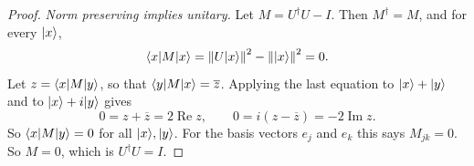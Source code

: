 \begin{exercisebox}
\begin{proof}
    \emph{Norm preserving implies unitary.} Let $M = U^\dagger U - I$. Then $M^\dagger = M$, and for
    every $\lvert x \rangle$,
    \[\langle x \rvert M \lvert x \rangle = \left\lVert U \lvert x \rangle \right\rVert^2 - \left\lVert \lvert x \rangle \right\rVert^2 = 0.\]
    Let $z = \langle x \rvert M \lvert y \rangle$, so that $\langle y \rvert M \lvert x \rangle = \overline{z}$. Applying the last
    equation to $\lvert x \rangle + \lvert y \rangle$ and to $\lvert x \rangle + i \lvert y \rangle$ gives
    \[0 = z + \overline{z} = 2 \operatorname{Re} z,
        \qquad
        0 = i \left(z - \overline{z}\right) = -2 \operatorname{Im} z.\]
    So $\langle x \rvert M \lvert y \rangle = 0$ for all $\lvert x \rangle, \lvert y \rangle$. For the basis vectors $e_j$ and $e_k$ this
    says $M_{jk} = 0$. So $M = 0$, which is $U^\dagger U = I$.
\end{proof}
\end{exercisebox}

